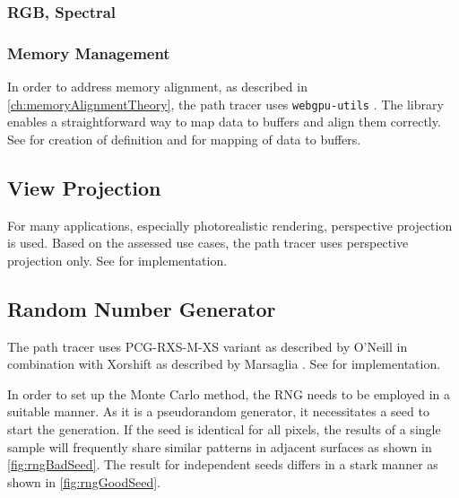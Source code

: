 \subsubsection{RGB, Spectral}
\subsubsection{Memory Management}

In order to address memory alignment, as described in \autoref{ch:memoryAlignmentTheory}, the path tracer uses \texttt{webgpu-utils} \cite{webgpuUtilsLib}. The library enables a straightforward way to map data to buffers and align them correctly. See  for creation of definition and  for mapping of data to buffers.


\subsection{View Projection}

For many applications, especially photorealistic rendering, perspective projection is used. Based on the assessed use cases, the path tracer uses perspective projection only. See  for implementation.

\subsection{Random Number Generator}

The path tracer uses PCG-RXS-M-XS variant as described by O’Neill \cite{o2014pcg} in combination with Xorshift as described by Marsaglia \cite{marsaglia2003xorshift}. See  for implementation.

In order to set up the Monte Carlo method, the \gls{RNG} needs to be employed in a suitable manner. As it is a pseudorandom generator, it necessitates a seed to start the generation. If the seed is identical for all pixels, the results of a single sample will frequently share similar patterns in adjacent surfaces as shown in \autoref{fig:rngBadSeed}. The result for independent seeds differs in a stark manner as shown in \autoref{fig:rngGoodSeed}.

